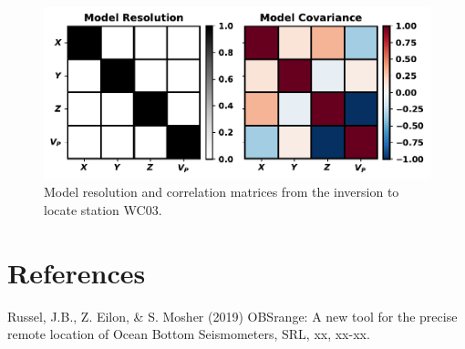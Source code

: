 \documentclass[titlepage, 12pt]{article}
\begin{document}
  \begin{figure}[!htb]
   \centering
   \includegraphics[width=0.9\linewidth]{resolution_matrices.pdf}
   \caption{Model resolution and correlation matrices from the inversion to locate station WC03.}
  \end{figure}

 \section*{References}
  Russel, J.B., Z. Eilon, \& S. Mosher (2019) OBSrange: A new tool for the precise remote location of Ocean Bottom Seismometers, SRL, xx, xx-xx.
\end{document}
